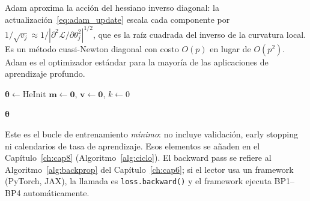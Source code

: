 Adam aproxima la acción del hessiano inverso diagonal: la
actualización~\eqref{eq:adam_update} escala cada componente por
$1/\sqrt{v_j} \approx 1/|\partial^2\mathcal{L}/\partial\theta_j^2|^{1/2}$,
que es la raíz cuadrada del inverso de la curvatura local. Es un método
cuasi-Newton diagonal con costo $O(p)$ en lugar de $O(p^2)$. Adam es el
optimizador estándar para la mayoría de las aplicaciones de aprendizaje
profundo.

\begin{algorithm}[H]
\caption{Entrenamiento con Adam: bucle mínimo}
\label{alg:adam_loop}
 
$\bm{\theta} \leftarrow \mathrm{HeInit}$\;
$\bm{m} \leftarrow \bm{0}$,\;
$\bm{v} \leftarrow \bm{0}$,\;
$k \leftarrow 0$\;
 
 
\Return $\bm{\theta}$\;
\end{algorithm}
 
Este es el bucle de entrenamiento \emph{mínimo}: no incluye validación,
early stopping ni calendarios de tasa de aprendizaje. Esos elementos se
añaden en el Capítulo~\ref{ch:cap8} (Algoritmo~\ref{alg:ciclo}). El
backward pass se refiere al Algoritmo~\ref{alg:backprop} del
Capítulo~\ref{ch:cap6}; si el lector usa un framework (PyTorch, JAX), la
llamada es \texttt{loss.backward()} y el framework ejecuta BP1--BP4
automáticamente.
 
